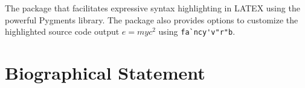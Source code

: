 \documentclass[12pt, oneside]{book}
\begin{document}
The package that facilitates expressive syntax highlighting in LATEX using the powerful Pygments library. The package also provides options to customize the highlighted source code output \(e = myc^2\) using \verb|fa`ncy'v"r"b|.

\appendix

\backmatter




\chapter{Biographical Statement}

\end{document}
